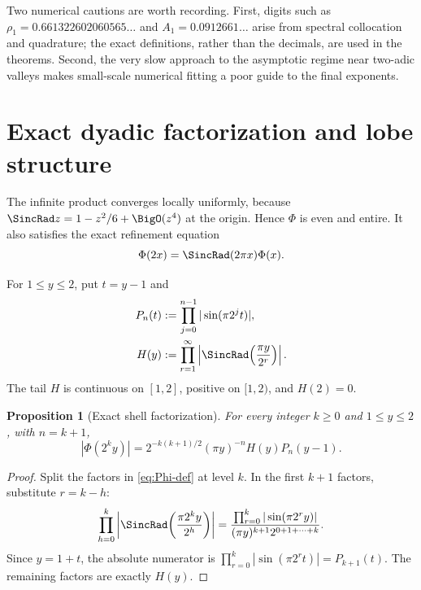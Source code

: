 \documentclass[11pt]{article}
\newtheorem{proposition}[theorem]{Proposition}
\theoremstyle{definition}
\theoremstyle{remark}
\begin{document}
Two numerical cautions are worth recording.  First, digits such as
\(\rho_1=0.661322602060565\ldots\) and \(A_1=0.0912661\ldots\) arise from
spectral collocation and quadrature; the exact definitions, rather than the
decimals, are used in the theorems.  Second, the very slow approach to the
asymptotic regime near two-adic valleys makes small-scale numerical fitting a
poor guide to the final exponents.

\section{Exact dyadic factorization and lobe structure}
\label{sec:factorization}

The infinite product converges locally uniformly, because
\(\SincRad z=1-z^2/6+\BigO(z^4)\) at the origin.  Hence \(\Phi\) is even and
entire.  It also satisfies the exact refinement equation\cite{arias1982,wikipedia}
\begin{equation}
 \Phi(2x)=\SincRad(2\pi x)\Phi(x).
 \label{eq:refinement}
\end{equation}

For \(1\le y\le2\), put \(t=y-1\) and
\begin{align}
 P_n(t)&:=\prod_{j=0}^{n-1}|\sin(\pi2^jt)|, \label{eq:Pn}\\
 H(y)&:=\prod_{r=1}^{\infty}
 \left|\SincRad\!\left(\frac{\pi y}{2^r}\right)\right|.
 \label{eq:H}
\end{align}
The tail \(H\) is continuous on \([1,2]\), positive on \([1,2)\), and
\(H(2)=0\).

\begin{proposition}[Exact shell factorization]
\label{prop:factorization}
For every integer \(k\ge0\) and \(1\le y\le2\), with \(n=k+1\),
\begin{equation}
 |\Phi(2^ky)|
 =2^{-k(k+1)/2}(\pi y)^{-n}H(y)P_n(y-1).
 \label{eq:factorization}
\end{equation}
\end{proposition}

\begin{proof}
Split the factors in \eqref{eq:Phi-def} at level \(k\).  In the first
\(k+1\) factors, substitute \(r=k-h\):
\[
 \prod_{h=0}^{k}
 \left|\SincRad\!\left(\frac{\pi2^ky}{2^h}\right)\right|
 =\frac{\prod_{r=0}^{k}|\sin(\pi2^ry)|}
 {(\pi y)^{k+1}2^{0+1+\cdots+k}}.
\]
Since \(y=1+t\), the absolute numerator is
\(\prod_{r=0}^k|\sin(\pi2^rt)|=P_{k+1}(t)\).  The remaining factors are
exactly \(H(y)\).
\end{proof}
\end{document}
